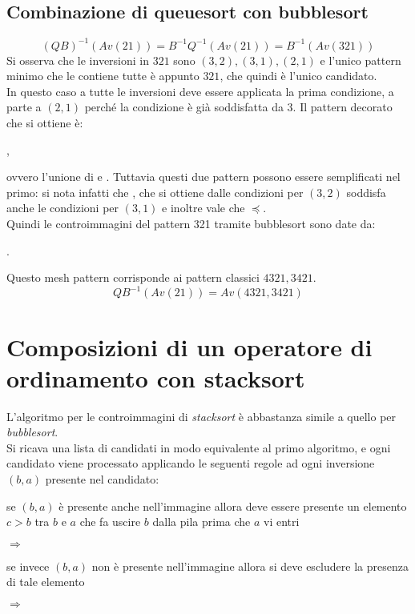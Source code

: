 \subsection{Combinazione di queuesort con bubblesort}
$$(QB)^{-1}(Av(21))=B^{-1}Q^{-1}(Av(21))=B^{-1}(Av(321))$$
Si osserva che le inversioni in $321$ sono $(3,2),(3,1),(2,1)$ e l'unico pattern minimo che le contiene tutte \`e appunto $321$, che quindi \`e l'unico candidato.\\
In questo caso a tutte le inversioni deve essere applicata la prima condizione, a parte a $(2,1)$ perch\'e la condizione \`e gi\`a soddisfatta da 3. Il pattern decorato che si ottiene \`e:
\begin{center}
,
\end{center}
ovvero  l'unione di  e . Tuttavia questi due pattern possono essere semplificati nel primo: si nota infatti che , che si ottiene dalle condizioni per $(3,2)$ soddisfa anche le condizioni per $(3,1)$ e inoltre vale che $\preceq$.\\
Quindi le controimmagini del pattern 321 tramite bubblesort sono date da:
\begin{center}
.
\end{center}
Questo mesh pattern corrisponde ai pattern classici $4321,3421$.$$QB^{-1}(Av(21))=Av(4321,3421)$$
\section{Composizioni di un operatore di ordinamento con stacksort}
L'algoritmo per le controimmagini di \textit{stacksort} \`e abbastanza simile a quello per \textit{bubblesort}.\\
Si ricava una lista di candidati in modo equivalente al primo algoritmo, e ogni candidato viene processato applicando le seguenti regole ad ogni inversione $(b,a)$ presente nel candidato:
\begin{description}
\item se $(b,a)$ \`e presente anche nell'immagine allora deve essere presente un elemento $c>b$ tra $b$ e $a$ che fa uscire $b$ dalla pila prima che $a$ vi entri
\begin{center}
 $\Longrightarrow$ 
\end{center}
\item se invece $(b,a)$ non \`e presente nell'immagine allora si deve escludere la presenza di tale elemento
\begin{center}
 $\Longrightarrow$ 
\end{center}
\end{description}
